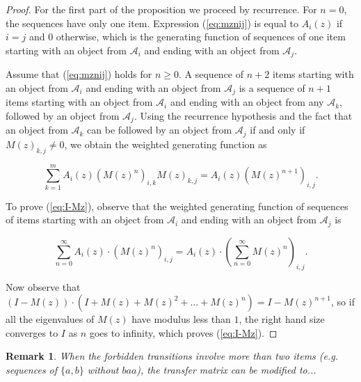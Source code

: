 \documentclass{article}
\newtheorem{remark}{Remark}
\begin{document}
\begin{proof}
For the first part of the proposition we proceed by recurrence. For $n =
0$, the sequences have only one item.  Expression (\ref{eq:mznij}) is
equal to $A_i(z)$ if $i = j$ and $0$ otherwise, which is the generating
function of sequences of one item starting with an object from
$\mathcal{A}_i$ and ending with an object from $\mathcal{A}_j$.

Assume that (\ref{eq:mznij}) holds for $n \geq 0$. A sequence of $n+2$
items starting with an object from $\mathcal{A}_i$ and ending with an
object from $\mathcal{A}_j$ is a sequence of $n+1$ items starting with an
object from $\mathcal{A}_i$ and ending with an object from any
$\mathcal{A}_k$, followed by an object from $\mathcal{A}_j$. Using the
recurrence hypothesis and the fact that an object from $\mathcal{A}_k$ can
be followed by an object from $\mathcal{A}_j$ if and only if $M(z)_{k,j}
\neq 0$, we obtain the weighted generating function as

\begin{equation*}
\sum_{k = 1}^m A_i(z)\left( M(z)^n \right)_{i,k} M(z)_{k,j} 
 = A_i(z) \left( M(z)^{n+1} \right)_{i,j}.
\end{equation*}

To prove (\ref{eq:I-Mz}), observe that the weighted generating function of
sequences of items starting with an object from $\mathcal{A}_i$ and ending
with an object from $\mathcal{A}_j$ is

\begin{equation*}
\sum_{n=0}^\infty A_i(z) \cdot \left(M(z)^n \right)_{i,j} =
 A_i(z) \cdot \left( \sum_{n=0}^\infty M(z)^n\right)_{i,j} .
\end{equation*}

Now observe that $(I-M(z)) \cdot (I+M(z)+M(z)^2+ \ldots + M(z)^n) =
I-M(z)^{n+1}$, so if all the eigenvalues of $M(z)$ have modulus less than
$1$, the right hand size converges to $I$ as $n$ goes to infinity, which
proves (\ref{eq:I-Mz}).
\end{proof}

\begin{remark}
When the forbidden transitions involve more than two items (\textit{e.g.}
sequences of $\{a,b\}$ without $baa$), the transfer matrix can be modified
to...
\end{remark}
\end{document}
